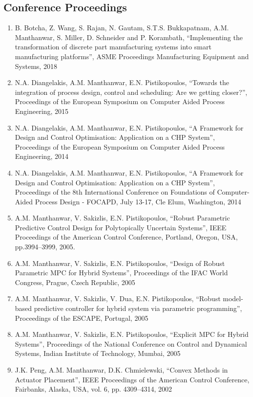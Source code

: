 \documentclass[10pt]{article}
\begin{document}
\subsection{Conference Proceedings}
\begin{enumerate}[nosep]
\item B. Botcha, Z. Wang, S. Rajan, N. Gautam, S.T.S. Bukkapatnam, A.M. Manthanwar, S. Miller, D. Schneider and P. Korambath, ``Implementing the transformation of discrete part manufacturing systems into smart manufacturing platforms'', ASME Proceedings Manufacturing Equipment and Systems, 2018

\item N.A. Diangelakis, A.M. Manthanwar, E.N. Pistikopoulos, ``Towards the integration of process design, control and scheduling: Are we getting closer?'', Proceedings of the European Symposium on Computer Aided Process Engineering, 2015

\item N.A. Diangelakis, A.M. Manthanwar, E.N. Pistikopoulos, ``A Framework for Design and Control Optimisation: Application on a CHP System'', Proceedings of the European Symposium on Computer Aided Process Engineering, 2014

\item N.A. Diangelakis, A.M. Manthanwar, E.N. Pistikopoulos, ``A Framework for Design and Control Optimisation: Application on a CHP System'', Proceedings of the 8th International Conference on Foundations of Computer-Aided Process Design - FOCAPD, July 13-17, Cle Elum, Washington, 2014

\item A.M. Manthanwar, V. Sakizlis, E.N. Pistikopoulos, ``Robust Parametric Predictive Control Design for Polytopically Uncertain Systems'', IEEE Proceedings of the American Control Conference, Portland, Oregon, USA, pp.3994–3999, 2005.

\item A.M. Manthanwar, V. Sakizlis, E.N. Pistikopoulos, ``Design of Robust Parametric MPC for Hybrid Systems'', Proceedings of the IFAC World Congress, Prague, Czech Republic, 2005

\item A.M. Manthanwar, V. Sakizlis, V. Dua, E.N. Pistikopoulos, ``Robust model-based predictive controller for hybrid system via parametric programming'', Proceedings of the ESCAPE, Portugal, 2005

\item A.M. Manthanwar, V. Sakizlis, E.N. Pistikopoulos, ``Explicit MPC for Hybrid Systems'', Proceedings of the National Conference on Control and Dynamical Systems, Indian Institute of Technology, Mumbai, 2005

\item J.K. Peng, A.M. Manthanwar, D.K. Chmielewski, ``Convex Methods in Actuator Placement'', IEEE Proceedings of the American Control Conference, Fairbanks, Alaska, USA, vol. 6, pp. 4309–4314, 2002
\end{enumerate}
\end{document}
